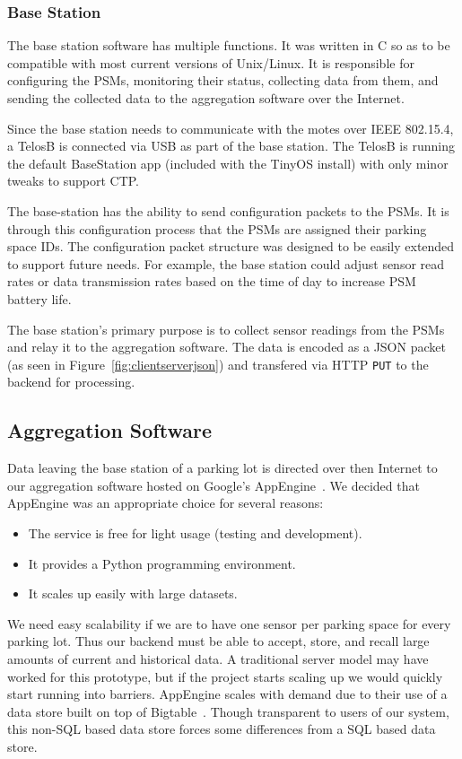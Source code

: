 \documentclass{acm_proc}
\begin{document}
\subsubsection{Base Station}

The base station software has multiple functions.  It was written in C so
as to be compatible with most current versions of Unix/Linux.
It is responsible for configuring the PSMs, monitoring their status, collecting data from them, and sending the collected data to the aggregation software over the Internet.

Since the base station needs to communicate with the motes over IEEE
802.15.4, a TelosB is connected via USB as part of the base station.
The TelosB is running the default BaseStation app (included with the TinyOS
install) with only minor tweaks to support CTP.

The base-station has the ability to send configuration packets to the PSMs.
It is through this configuration process that the PSMs are assigned their
parking space IDs.
The configuration packet structure was designed to be easily extended to
support future needs.
For example, the base station could adjust sensor read rates or data
transmission rates based on the time of day to increase PSM battery life.

The base station's primary purpose is to collect sensor readings from the
PSMs and relay it to the aggregation software.
The data is encoded as a JSON packet (as seen in
Figure~\ref{fig:clientserverjson}) and transfered via HTTP \texttt{PUT} to
the backend for processing.

\subsection{Aggregation Software}

Data leaving the base station of a parking lot is directed over then
Internet to our aggregation software hosted on Google's
AppEngine~\cite{google:appengine}.
We decided that AppEngine was an appropriate choice for several reasons:
\begin{itemize}
	\item The service is free for light usage (testing and development).
	\item It provides a Python programming environment.
	\item It scales up easily with large datasets.
\end{itemize}

We need easy scalability if we are to have one sensor per parking space for
every parking lot.
Thus our backend must be able to accept, store, and recall large amounts of
current and historical data.
A traditional server model may have worked for this prototype, but if the
project starts scaling up we would quickly start running into barriers.
AppEngine scales with demand due to their use of a data store built on top
of Bigtable~\cite{google:bigtable}.
Though transparent to users of our system, this non-SQL based data store
forces some differences from a SQL based data store.
\end{document}
